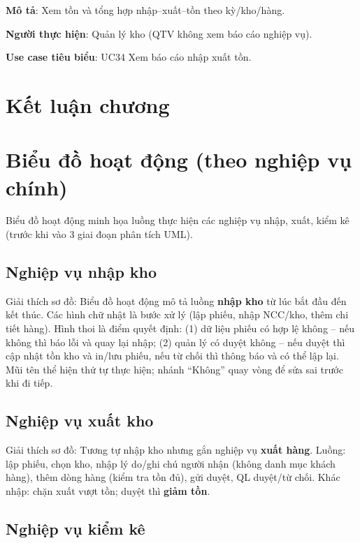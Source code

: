 \textbf{Mô tả}: Xem tồn và tổng hợp nhập--xuất--tồn theo kỳ/kho/hàng.

\textbf{Người thực hiện}: Quản lý kho (QTV không xem báo cáo nghiệp vụ).

\textbf{Use case tiêu biểu}: UC34 Xem báo cáo nhập xuất tồn.

\section{Kết luận chương}

\section{Biểu đồ hoạt động (theo nghiệp vụ chính)}

Biểu đồ hoạt động minh họa luồng thực hiện các nghiệp vụ nhập, xuất, kiểm kê (trước khi vào 3 giai đoạn phân tích UML).

\subsection{Nghiệp vụ nhập kho}


Giải thích sơ đồ: Biểu đồ hoạt động mô tả luồng \textbf{nhập kho} từ lúc bắt đầu đến kết thúc. Các hình chữ nhật là bước xử lý (lập phiếu, nhập NCC/kho, thêm chi tiết hàng). Hình thoi là điểm quyết định: (1) dữ liệu phiếu có hợp lệ không -- nếu không thì báo lỗi và quay lại nhập; (2) quản lý có duyệt không -- nếu duyệt thì cập nhật tồn kho và in/lưu phiếu, nếu từ chối thì thông báo và có thể lập lại. Mũi tên thể hiện thứ tự thực hiện; nhánh ``Không'' quay vòng để sửa sai trước khi đi tiếp.

\subsection{Nghiệp vụ xuất kho}


Giải thích sơ đồ: Tương tự nhập kho nhưng gắn nghiệp vụ \textbf{xuất hàng}. Luồng: lập phiếu, chọn kho, nhập lý do/ghi chú người nhận (không danh mục khách hàng), thêm dòng hàng (kiểm tra tồn đủ), gửi duyệt, QL duyệt/từ chối. Khác nhập: chặn xuất vượt tồn; duyệt thì \textbf{giảm tồn}.

\subsection{Nghiệp vụ kiểm kê}


